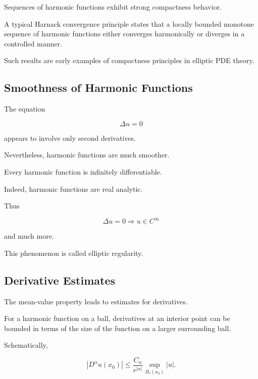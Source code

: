 Sequences of harmonic functions exhibit strong compactness behavior.

A typical Harnack convergence principle states that a locally bounded
monotone sequence of harmonic functions either converges harmonically or
diverges in a controlled manner.

Such results are early examples of compactness principles in elliptic
PDE theory.

\subsection{Smoothness of Harmonic Functions}
\label{subsec:harmonic-smoothness}

The equation

\[
\Delta u=0
\]

appears to involve only second derivatives.

Nevertheless, harmonic functions are much smoother.

\begin{theorem}
Every harmonic function is infinitely differentiable.

Indeed, harmonic functions are real analytic.
\end{theorem}

Thus

\[
\boxed{
\Delta u=0
\Longrightarrow
u\in C^\infty
}
\]

and much more.

This phenomenon is called elliptic regularity.

\subsection{Derivative Estimates}
\label{subsec:harmonic-derivative-estimates}

The mean-value property leads to estimates for derivatives.

For a harmonic function on a ball, derivatives at an interior point can
be bounded in terms of the size of the function on a larger surrounding
ball.

Schematically,

\[
\boxed{
|D^\alpha u(x_0)|
\leq
\frac{C_\alpha}{r^{|\alpha|}}
\sup_{B_r(x_0)}|u|.
}
\]


